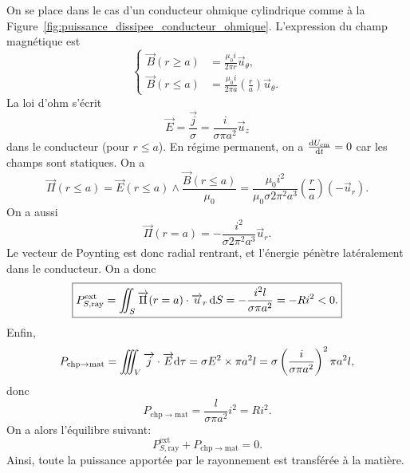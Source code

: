 On se place dans le cas d'un conducteur ohmique cylindrique comme à la Figure~\ref{fig:puissance_dissipee_conducteur_ohmique}. L'expression du champ magnétique est
\begin{equation*}
    \left\lbrace
        \begin{aligned}
            \vec{B}(r\geqslant a)&=\frac{\mu_0 i}{2\pi r}\vec{u}_{\theta},\\
            \vec{B}(r\leqslant a)&=\frac{\mu_0 i}{2\pi a}\left(\frac{r}{a}\right)\vec{u}_{\theta}.
        \end{aligned}
    \right.
\end{equation*}
La loi d'ohm s'écrit
\begin{equation*}
    \vec{E}=\frac{\vec{j}}{\sigma}=\frac{i}{\sigma\pi a^{2}}\vec{u}_z
\end{equation*}
dans le conducteur (pour $r\leqslant a$). En régime permanent, on a $\frac{\mathrm{d} U_{\mathrm{em}}}{\mathrm{d} t}=0$ car les champs sont statiques. On a 
\begin{equation*}
    \vec{\Pi}(r \leqslant a)=\vec{E}(r\leqslant a)\wedge \frac{\vec{B}(r\leqslant a)}{\mu_0}=\frac{\mu_0 i^{2}}{\mu_0\sigma 2\pi^{2}a^{3}}\left(\frac{r}{a}\right)(-\vec{u}_r).
\end{equation*}
On a aussi
\begin{equation*}
    \boxed{
        \vec{\Pi}(r=a)=-\frac{i^{2}}{\sigma 2\pi^{2}a^{3}}\vec{u}_r.
    }
\end{equation*}
Le vecteur de Poynting est donc radial rentrant, et l'énergie pénètre latéralement dans le conducteur.
On a donc
\begin{equation*}
    \boxed{
        P_{S,\mathrm{ray}}^{\mathrm{ext}}=\iint_{S}\protect\overrightarrow{{\Pi}}(r=a)\cdot\protect\overrightarrow{{u}}_r\,\mathrm{d} S=-\frac{i^{2}l}{\sigma\pi a^{2}}=-R i^{2}<0.
    }
\end{equation*}
Enfin,
\begin{equation*}
    P_{\mathrm{chp}\to\mathrm{mat}}=\iiint_{V}\protect\overrightarrow{{j}}\cdot\protect\overrightarrow{{E}}\mathrm{d}\tau=\sigma E^{2}\times\pi a^{2}l=\sigma\left(\frac{i}{\sigma\pi a^{2}}\right)^{2}\pi a^{2}l,
\end{equation*}
donc
\begin{equation*}
    \boxed{
        P_{\mathrm{chp}\to\mathrm{mat}}=\frac{l}{\sigma\pi a^{2}}i^{2}=Ri^{2}.
    }
\end{equation*}
On a alors l'équilibre suivant:
\begin{equation*}
    \boxed{
        P_{S,\mathrm{ray}}^{\mathrm{ext}}+P_{\mathrm{chp}\to\mathrm{mat}}=0.
    }
\end{equation*}
Ainsi, toute la puissance apportée par le rayonnement est transférée à la matière.